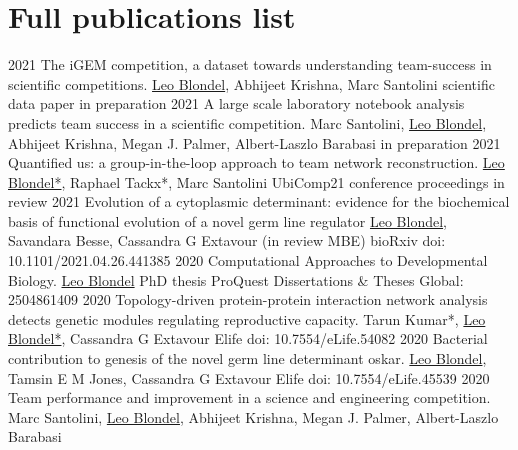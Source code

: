 \documentclass[]{twentysecondcv}
\begin{document}

\section{Full publications list}

\begin{twentyshort}
  \twentyitemcite
    {2021}
    {The iGEM competition, a dataset towards understanding team-success in scientific competitions.}
    {\underline{Leo Blondel}, Abhijeet Krishna, Marc Santolini}
    {}
    {scientific data paper in preparation}
  \twentyitemcite
    {2021}
    {A large scale laboratory notebook analysis predicts team success in a scientific competition.}
    {Marc Santolini, \underline{Leo Blondel}, Abhijeet Krishna, Megan J. Palmer, Albert-Laszlo Barabasi}
    {}
    {in preparation}
  \twentyitemcite
    {2021}
    {Quantified us: a group-in-the-loop approach to team network reconstruction.}
    {\underline{Leo Blondel*}, Raphael Tackx*, Marc Santolini}
    {UbiComp21 conference proceedings}
    {in review}
  \twentyitemcite
    {2021}
    {Evolution of a cytoplasmic determinant: evidence for the biochemical basis of functional evolution of a novel germ line regulator}
    {\underline{Leo Blondel}, Savandara Besse, Cassandra G Extavour}
    {(in review MBE)}
    {bioRxiv doi: 10.1101/2021.04.26.441385}
  \twentyitemcite
    {2020}
    {Computational Approaches to Developmental Biology.}
    {\underline{Leo Blondel}}
    {PhD thesis}
    {ProQuest Dissertations \& Theses Global: 2504861409}
  \twentyitemcite
    {2020}
    {Topology-driven protein-protein interaction network analysis detects genetic modules regulating reproductive capacity.}
    {Tarun Kumar*, \underline{Leo Blondel*}, Cassandra G Extavour}
    {Elife}
    {doi: 10.7554/eLife.54082}
  \twentyitemcite
    {2020}
    {Bacterial contribution to genesis of the novel germ line determinant oskar.}
    {\underline{Leo Blondel}, Tamsin E M Jones, Cassandra G Extavour}
    {Elife}
    {doi: 10.7554/eLife.45539}
  \twentyitemcite
    {2020}
    {Team performance and improvement in a science and engineering competition.}
    {Marc Santolini, \underline{Leo Blondel}, Abhijeet Krishna, Megan J. Palmer, Albert-Laszlo Barabasi}

\end{twentyshort}
\end{document}
